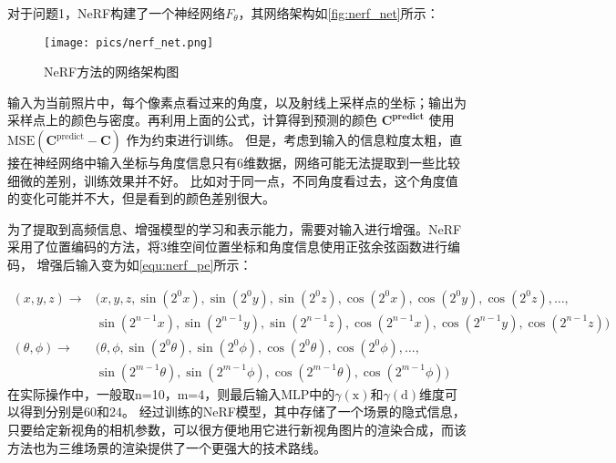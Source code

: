 \par 对于问题1，NeRF构建了一个神经网络$F_\theta$，其网络架构如\autoref{fig:nerf_net}所示：
\begin{figure}[htbp]
    \centering
    \texttt{[image: pics/nerf\_net.png]}
    \caption{\label{fig:nerf_net}NeRF方法的网络架构图}
\end{figure}




\par 输入为当前照片中，每个像素点看过来的角度，以及射线上采样点的坐标；输出为采样点上的颜色与密度。再利用上面的公式，计算得到预测的颜色 
\(\boldsymbol{C^{\text{predict}}}\)
使用 $\mathrm{MSE}(\boldsymbol{C}^{\text{predict}} - \boldsymbol{C})$ 作为约束进行训练。
但是，考虑到输入的信息粒度太粗，直接在神经网络中输入坐标与角度信息只有6维数据，网络可能无法提取到一些比较细微的差别，训练效果并不好。
比如对于同一点，不同角度看过去，这个角度值的变化可能并不大，但是看到的颜色差别很大。
\par 为了提取到高频信息、增强模型的学习和表示能力，需要对输入进行增强。NeRF采用了位置编码的方法，将3维空间位置坐标和角度信息使用正弦余弦函数进行编码，
增强后输入变为如\autoref{equ:nerf_pe}所示：

\begin{equation}
    \label{equ:nerf_pe}
    \begin{aligned}
        (x,y,z) \to & (x,y,z, \sin(2^0 x), \sin(2^0 y), \sin(2^0 z), \cos(2^0 x), \cos(2^0 y), \cos(2^0 z), \ldots, \\
                    & \sin(2^{n-1} x), \sin(2^{n-1} y), \sin(2^{n-1} z), \cos(2^{n-1} x), \cos(2^{n-1} y), \cos(2^{n-1} z)) \\
        (\theta,\phi) \to & (\theta,\phi, \sin(2^0 \theta), \sin(2^0 \phi), \cos(2^0 \theta), \cos(2^0 \phi), \ldots, \\
                          & \sin(2^{m-1} \theta), \sin(2^{m-1} \phi), \cos(2^{m-1} \theta), \cos(2^{m-1} \phi))
    \end{aligned}
\end{equation}
在实际操作中，一般取n=10，m=4，则最后输入MLP中的\(\gamma(\mathrm{x})\)和\(\gamma(\mathrm{d})\)维度可以得到分别是60和24。
	经过训练的NeRF模型，其中存储了一个场景的隐式信息，只要给定新视角的相机参数，可以很方便地用它进行新视角图片的渲染合成，而该方法也为三维场景的渲染提供了一个更强大的技术路线。


